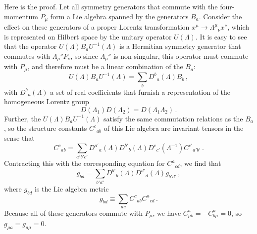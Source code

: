 Here is the proof. Let all symmetry generators that commute with the
four-momentum $P_\mu$ form a Lie algebra spanned by the generators $B_a$.
Consider the effect on these generators of a proper Lorentz transformation
$x^\mu\longrightarrow\Lambda^\mu{}_\nu x^\nu$, which is represented on Hilbert
space by the unitary operator $U(\Lambda)$. It is easy to see that the operator
$U(\Lambda)B_a U^{-1}(\Lambda)$ is a Hermitian symmetry generator that
commutes with $\Lambda_\mu{}^\nu P_\nu$, so since $\Lambda_\mu{}^\nu$ is
non-singular, this operator must commute with $P_\mu$, and therefore must be a
linear combination of the $B_a$:
\begin{equation}
  U(\Lambda)B_a U^{-1}(\Lambda)
  =\sum_b D^b{}_a(\Lambda)B_b\,,
  \tag{24.1.1}\label{eq:24.1.1}
\end{equation}
with $D^b{}_a(\Lambda)$ a set of real coefficients that furnish a
representation of the homogeneous Lorentz group
\begin{equation}
  D(\Lambda_1)D(\Lambda_2)=D(\Lambda_1\Lambda_2)\,.
  \tag{24.1.2}\label{eq:24.1.2}
\end{equation}
Further, the $U(\Lambda)B_a U^{-1}(\Lambda)$ satisfy the same commutation
relations as the $B_a$, so the structure constants
$C^c{}_{ab}$ of this Lie algebra are invariant tensors in the
sense that
\begin{equation}
  C^c{}_{ab}
  =\sum_{a'b'c'}
  D^{a'}{}_a(\Lambda)
  D^{b'}{}_b(\Lambda)
  D^c{}_{c'}(\Lambda^{-1})
  C^{c'}{}_{a'b'}\,.
  \tag{24.1.3}\label{eq:24.1.3}
\end{equation}
Contracting this with the corresponding equation for
$C^a{}_{cd}$, we find that
\begin{equation}
  g_{bd}
  =\sum_{b'd'}
  D^{b'}{}_b(\Lambda)
  D^{d'}{}_d(\Lambda)
  g_{b'd'}\,,
  \tag{24.1.4}\label{eq:24.1.4}
\end{equation}
where $g_{bd}$ is the Lie algebra metric
\begin{equation}
  g_{bd}
  \equiv\sum_{ac}
  C^c{}_{ab}C^a{}_{cd}\,.
  \tag{24.1.5}\label{eq:24.1.5}
\end{equation}
Because all of these generators commute with $P_\mu$, we have
$C^a_{\mu b}=-C^a_{b\mu}=0$, so
$g_{\mu a}=g_{a\mu}=0$.

